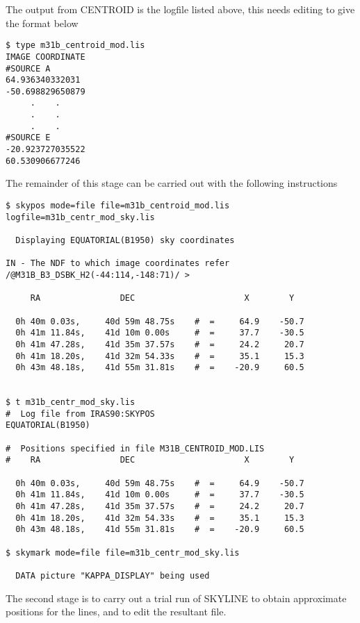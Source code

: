 The output from CENTROID is the logfile listed above, this needs editing to give
the format below
\begin{small}
\begin{verbatim}
$ type m31b_centroid_mod.lis
IMAGE COORDINATE
#SOURCE A
64.936340332031
-50.698829650879  
     .    .
     .    .
     .    .
#SOURCE E
-20.923727035522
60.530906677246  
\end{verbatim}
\end{small}
The remainder of this stage can be carried out with the following instructions
\begin{small}
\begin{verbatim}
$ skypos mode=file file=m31b_centroid_mod.lis logfile=m31b_centr_mod_sky.lis

  Displaying EQUATORIAL(B1950) sky coordinates

IN - The NDF to which image coordinates refer /@M31B_B3_DSBK_H2(-44:114,-148:71)/ > 

     RA                DEC                      X        Y

  0h 40m 0.03s,     40d 59m 48.75s    #  =     64.9    -50.7
  0h 41m 11.84s,    41d 10m 0.00s     #  =     37.7    -30.5
  0h 41m 47.28s,    41d 35m 37.57s    #  =     24.2     20.7
  0h 41m 18.20s,    41d 32m 54.33s    #  =     35.1     15.3
  0h 43m 48.18s,    41d 55m 31.81s    #  =    -20.9     60.5


$ t m31b_centr_mod_sky.lis
#  Log file from IRAS90:SKYPOS
EQUATORIAL(B1950)        
 
#  Positions specified in file M31B_CENTROID_MOD.LIS
#    RA                DEC                      X        Y 
 
  0h 40m 0.03s,     40d 59m 48.75s    #  =     64.9    -50.7 
  0h 41m 11.84s,    41d 10m 0.00s     #  =     37.7    -30.5 
  0h 41m 47.28s,    41d 35m 37.57s    #  =     24.2     20.7 
  0h 41m 18.20s,    41d 32m 54.33s    #  =     35.1     15.3 
  0h 43m 48.18s,    41d 55m 31.81s    #  =    -20.9     60.5 

$ skymark mode=file file=m31b_centr_mod_sky.lis

  DATA picture "KAPPA_DISPLAY" being used
\end{verbatim}
\end{small}

The second stage is to carry out a trial run of SKYLINE to obtain approximate
positions for the lines, and to edit the resultant file. 

